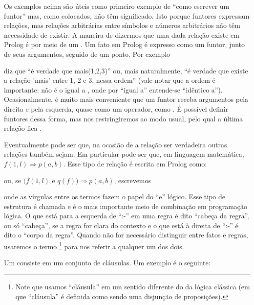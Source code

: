 Os exemplos acima são úteis como primeiro exemplo de ``como escrever um funtor'' mas, como colocados, não têm significado. Isto
porque funtores expressam relações, mas relações arbitrárias entre símbolos e números arbitrários não têm necessidade de existir.
A maneira de dizermos que uma dada relação existe em Prolog é por meio de um . Um fato em Prolog é expresso como
um funtor, junto de seus argumentos, seguido de um ponto. Por exemplo


\noindent diz que ``é verdade que mais(1,2,3)'' ou, mais naturalmente, ``é verdade que existe a relação 'mais' entre 1, 2 e 3, nessa ordem'' (vale notar que a ordem é importante:  não é o igual a , onde por ``igual a'' entende-se ``idêntico a'').
Ocasionalmente, é muito mais conveniente que um funtor receba argumentos pela direita e pela esquerda, quase como um operador,
como . É possível definir funtores dessa forma, mas nos restringiremos ao modo usual, pelo qual a última relação fica
.

Eventualmente pode ser que, na ocasião de a relação  ser verdadeira outras relações também sejam.
Em particular pode ser que, em linguagem matemática, $ f(1,l) \Rightarrow p(a,b) $. Esse tipo de relação é escrita em Prolog como:


\noindent ou, se $ (f(1,l)$ e $q(f)) \Rightarrow p(a,b) $, escrevemos


\noindent onde as vírgulas entre os termos fazem o papel do ``e'' lógico. Esse tipo de estrutura é chamada 
e é o mais importante meio de combinação em programação lógica. O que está para a esquerda de ``:-'' em uma regra é dito
``cabeça da regra'', ou só ``cabeça'', se a regra for clara do contexto e o que está à direita de ``:-'' é dito o
``corpo da regra''. Quando não for necessário distinguir entre fatos e regras, usaremos o termo
\footnote{Note que usamos ``cláusula'' em um sentido diferente do da lógica
  clássica (em que ``cláusula'' é definida como sendo uma disjunção de proposições). } para
nos referir a qualquer um dos dois.

Um  consiste em um conjunto de cláusulas. Um exemplo é o seguinte:\\

